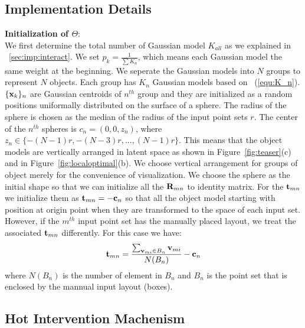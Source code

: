 \subsection{Implementation Details}
\textbf{Initialization of $\Theta$}:\\
We first determine the total number of Gaussian model $K_{all}$ as we explained in ~\ref{sec:imp:interact}. 
We set $p_k=\frac{1}{\sum K_n}$, which means each Gaussian model  the same weight at the beginning. 
We seperate  the Gaussian models into $N$ groups to represent $N$ objects. 
Each group has $K_n$ Gaussian models based on ~(\ref{equ:K_n}). $\{\mathbf{x}_k\}_n$ are Gaussian centroids of $n^{th}$ group and they are initialized as a random positions uniformally  distributed on the surface of a sphere. 
The radius of the sphere is chosen as the median of the radius of the input point sets $r$. The center of the $n^{th}$ spheres is $c_n=(0,0,z_n)$, where $z_n\in \{-(N-1)r,-(N-3)r,...,(N-1)r\}$. This means that the object models are vertically arranged in latent space as shown in Figure~\ref{fig:teaser}(c) and in Figure~\ref{fig:localoptimal}(b). 
We choose vertical arrangement for groups of object merely for the convenience of visualization. We choose the sphere as the initial shape so that we can initialize all the $\mathbf{R}_{mn}$ to identity matrix. For the $\mathbf{t}_{mn}$ we initialize them as $\mathbf{t}_{mn}=- \mathbf{c}_n$ so that all the object model starting with position at origin point when they are transformed to the space of each input set. However, if the $m^{th}$ input point set has the manually placed layout, we treat the associated $\mathbf{t}_{mn}$ differently. For this case we have:
\begin{equation}
\label{equ:initt}
\mathbf{t}_{mn}=\frac{\sum_{\mathbf{v}_{mi} \in B_n}\mathbf{v}_{mi}}{N(B_n)}-\mathbf{c}_n
\end{equation}
where $N(B_n)$ is the number of element in $B_n$ and $B_n$ is the point set that is enclosed by the mannual  input layout (boxes). 



\subsection{Hot Intervention Machenism }
%

